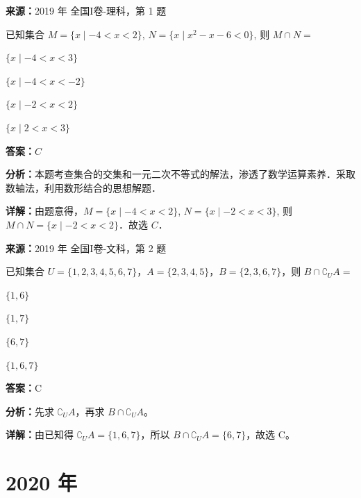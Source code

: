 \begin{question}[points=5]
\textbf{来源：}2019 年 全国I卷-理科，第 1 题\par
已知集合 $M = \{x \mid -4 < x < 2\}$, $N = \{x \mid x^2 - x - 6 < 0\}$, 则 $M \cap N =$
\begin{choices}
  \item $\{x \mid -4 < x < 3\}$
  \item $\{x \mid -4 < x < -2\}$
  \item $\{x \mid -2 < x < 2\}$
  \item $\{x \mid 2 < x < 3\}$
\end{choices}
\begin{solution}
\textbf{答案：}$C$

\textbf{分析：}本题考查集合的交集和一元二次不等式的解法，渗透了数学运算素养．采取数轴法，利用数形结合的思想解题．

\textbf{详解：}由题意得，$M = \{x \mid -4 < x < 2\}$, $N = \{x \mid -2 < x < 3\}$, 则 $M \cap N = \{x \mid -2 < x < 2\}$．故选 $C$．
\end{solution}
\end{question}

\begin{question}[points=5]
\textbf{来源：}2019 年 全国I卷-文科，第 2 题\par
已知集合 $U = \{1,2,3,4,5,6,7\}$，$A = \{2,3,4,5\}$，$B = \{2,3,6,7\}$，则 $B \cap \complement_U A =$
\begin{choices}
  \item $\{1,6\}$
  \item $\{1,7\}$
  \item $\{6,7\}$
  \item $\{1,6,7\}$
\end{choices}
\begin{solution}
\textbf{答案：}C

\textbf{分析：}先求 $\complement_U A$，再求 $B \cap \complement_U A$。

\textbf{详解：}由已知得 $\complement_U A = \{1,6,7\}$，所以 $B \cap \complement_U A = \{6,7\}$，故选 C。
\end{solution}
\end{question}

\section*{2020 年}

